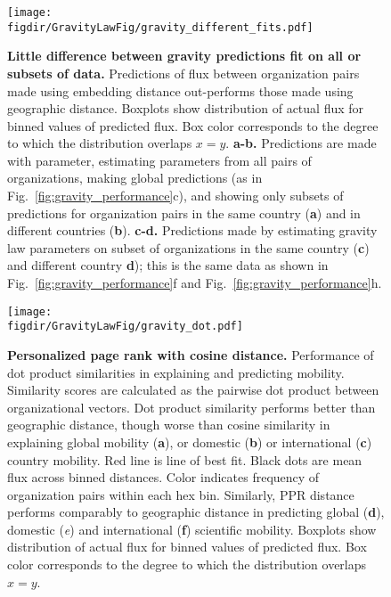 \documentclass[12pt]{article} %
\def\figdir{../Figs}
\begin{document}
%
%
\begin{figure}[p!]
	\centering
	\texttt{[image: \\figdir/GravityLawFig/gravity\_different\_fits.pdf]}
	\caption{
		\textbf{Little difference between gravity predictions fit on all or subsets of data.}
		Predictions of flux between organization pairs made using embedding distance out-performs those made using geographic distance.
		Boxplots show distribution of actual flux for binned values of predicted flux.
		Box color corresponds to the degree to which the distribution overlaps $x = y$.
		\textbf{a-b.} Predictions are made with parameter, estimating parameters from all pairs of organizations, making global predictions (as in Fig.~\ref{fig:gravity_performance}c), and showing only subsets of predictions for organization pairs in the same country (\textbf{a}) and in different countries (\textbf{b}).
		\textbf{c-d.} Predictions made by estimating gravity law parameters on subset of organizations in the same country (\textbf{c}) and different country \textbf{d});
		this is the same data as shown in Fig.~\ref{fig:gravity_performance}f and Fig.~\ref{fig:gravity_performance}h.
	}
	\label{fig:supp:gravity_prediction_subsets}
\end{figure}



%
%
\begin{figure}[p!]
	\centering
	\texttt{[image: \\figdir/GravityLawFig/gravity\_dot.pdf]}
	\caption{
		\textbf{Personalized page rank with cosine distance.}
		Performance of dot product similarities in explaining and predicting mobility.
		Similarity scores are calculated as the pairwise dot product between organizational vectors. 
		Dot product similarity performs better than geographic distance, though worse than cosine similarity in explaining global mobility (\textbf{a}), or domestic (\textbf{b}) or international (\textbf{c}) country mobility.
		Red line is line of best fit.
		Black dots are mean flux across binned distances.
		Color indicates frequency of organization pairs within each hex bin.
		Similarly, PPR distance performs comparably to geographic distance in predicting global (\textbf{d}), domestic (\textit{e}) and international (\textbf{f}) scientific mobility.
		Boxplots show distribution of actual flux for binned values of predicted flux.
		Box color corresponds to the degree to which the distribution overlaps $x = y$.
	}
	\label{fig:supp:gravity_dot}
\end{figure}
\end{document}
